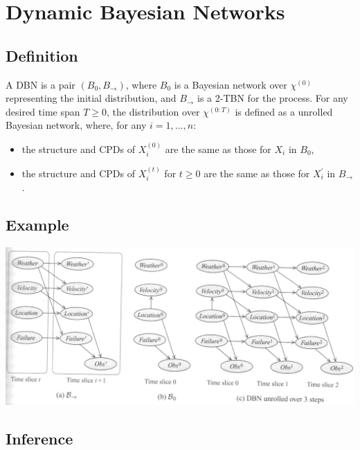 \section{Dynamic Bayesian Networks}
\subsection{Definition}
\begin{frame}
\begin{definition}
        A DBN is a pair $(B_0, B_{\rightarrow})$, where $B_0$ is a Bayesian network over $\chi^{(0)}$ representing the initial distribution, and $B_{\rightarrow}$ is a 2-TBN for the process. For any desired time span $T \geq 0$, the distribution over $\chi^{(0:T)}$ is defined as a unrolled Bayesian network, where, for any $i=1,...,n$:
        \begin{itemize}
        \item the structure and CPDs of $X_i^{(0)}$ are the same as those for $X_i$ in $B_0$,
        \item the structure and CPDs of $X_i^{(t)}$ for $ t \geq 0 $ are the same as those for $X_i^{'}$ in $B_\rightarrow$.
        \end{itemize}
\end{definition}
\end{frame}

\subsection{Example}
\begin{frame}
\includegraphics[width=.9\textwidth]{figures/dbn}
\end{frame}

\subsection{Inference}

